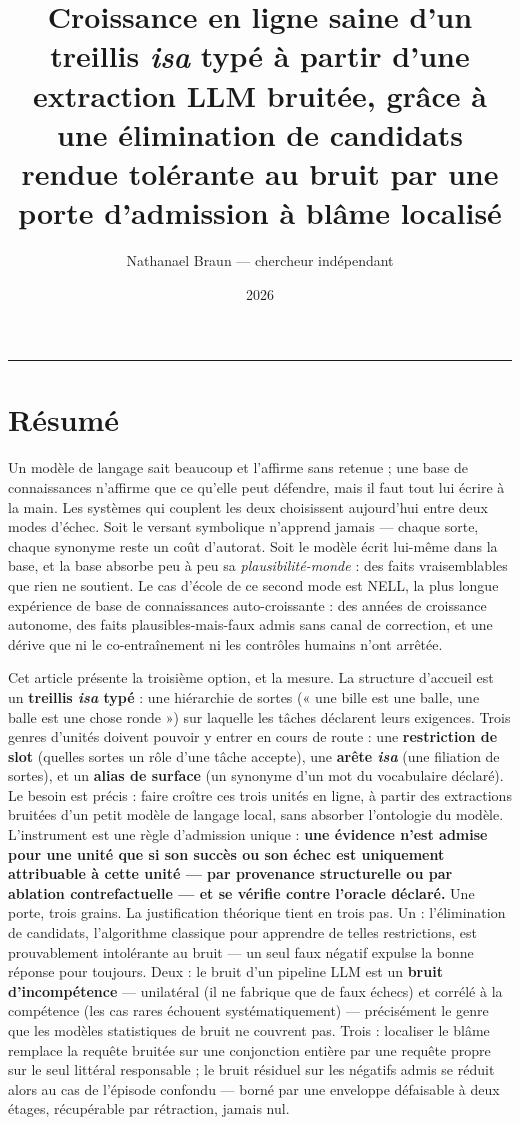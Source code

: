 \documentclass[11pt]{article}
\title{\textbf{Croissance en ligne saine d'un treillis \emph{isa} typé à partir d'une extraction LLM bruitée, grâce à une élimination de candidats rendue tolérante au bruit par une porte d'admission à blâme localisé}}
\author{Nathanael Braun — chercheur indépendant}
\date{2026}
\begin{document}
\maketitle
\medskip\hrule\medskip

\section*{Résumé}

Un modèle de langage sait beaucoup et l'affirme sans retenue ; une base de connaissances n'affirme que ce qu'elle peut défendre, mais il faut tout lui écrire à la main. Les systèmes qui couplent les deux choisissent aujourd'hui entre deux modes d'échec. Soit le versant symbolique n'apprend jamais — chaque sorte, chaque synonyme reste un coût d'autorat. Soit le modèle écrit lui-même dans la base, et la base absorbe peu à peu sa \emph{plausibilité-monde} : des faits vraisemblables que rien ne soutient. Le cas d'école de ce second mode est NELL, la plus longue expérience de base de connaissances auto-croissante : des années de croissance autonome, des faits plausibles-mais-faux admis sans canal de correction, et une dérive que ni le co-entraînement ni les contrôles humains n'ont arrêtée.

Cet article présente la troisième option, et la mesure. La structure d'accueil est un \textbf{treillis \emph{isa} typé} : une hiérarchie de sortes (« une bille est une balle, une balle est une chose ronde ») sur laquelle les tâches déclarent leurs exigences. Trois genres d'unités doivent pouvoir y entrer en cours de route : une \textbf{restriction de slot} (quelles sortes un rôle d'une tâche accepte), une \textbf{arête \emph{isa}} (une filiation de sortes), et un \textbf{alias de surface} (un synonyme d'un mot du vocabulaire déclaré). Le besoin est précis : faire croître ces trois unités en ligne, à partir des extractions bruitées d'un petit modèle de langage local, sans absorber l'ontologie du modèle. L'instrument est une règle d'admission unique : \textbf{une évidence n'est admise pour une unité que si son succès ou son échec est uniquement attribuable à cette unité — par provenance structurelle ou par ablation contrefactuelle — et se vérifie contre l'oracle déclaré.} Une porte, trois grains. La justification théorique tient en trois pas. Un : l'élimination de candidats, l'algorithme classique pour apprendre de telles restrictions, est prouvablement intolérante au bruit — un seul faux négatif expulse la bonne réponse pour toujours. Deux : le bruit d'un pipeline LLM est un \textbf{bruit d'incompétence} — unilatéral (il ne fabrique que de faux échecs) et corrélé à la compétence (les cas rares échouent systématiquement) — précisément le genre que les modèles statistiques de bruit ne couvrent pas. Trois : localiser le blâme remplace la requête bruitée sur une conjonction entière par une requête propre sur le seul littéral responsable ; le bruit résiduel sur les négatifs admis se réduit alors au cas de l'épisode confondu — borné par une enveloppe défaisable à deux étages, récupérable par rétraction, jamais nul.
\end{document}
